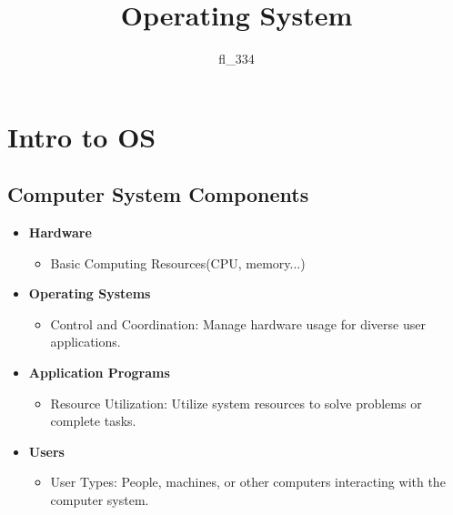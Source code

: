 \documentclass[11pt]{article}
\theoremstyle{definition}
\begin{document}
\title{Operating System}
\author{fl\_334}
\date{}
\thispagestyle{empty}
\maketitle

\tableofcontents
\clearpage
\section{Intro to OS}
    \subsection{Computer System Components}
    \begin{itemize}
        \item \textbf{Hardware}
        \begin{itemize}
            \item Basic Computing Resources(CPU, memory...)
        \end{itemize}

        \item \textbf{Operating Systems}
        \begin{itemize}
            \item Control and Coordination: Manage hardware usage for diverse user applications.
        \end{itemize}

        \item \textbf{Application Programs}
        \begin{itemize}
            \item Resource Utilization: Utilize system resources to solve problems or complete tasks.
        \end{itemize}

        \item \textbf{Users}
        \begin{itemize}
            \item User Types: People, machines, or other computers interacting with the computer system.
        \end{itemize}
    \end{itemize}
\end{document}
